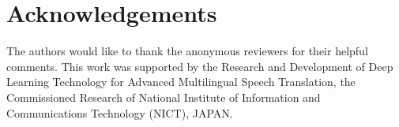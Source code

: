\section*{Acknowledgements}
The authors would like to thank the anonymous reviewers for their helpful comments.
This work was supported by the Research and Development of Deep Learning Technology for Advanced Multilingual Speech Translation, the Commissioned Research of National Institute of Information and Communications Technology (NICT), JAPAN.
